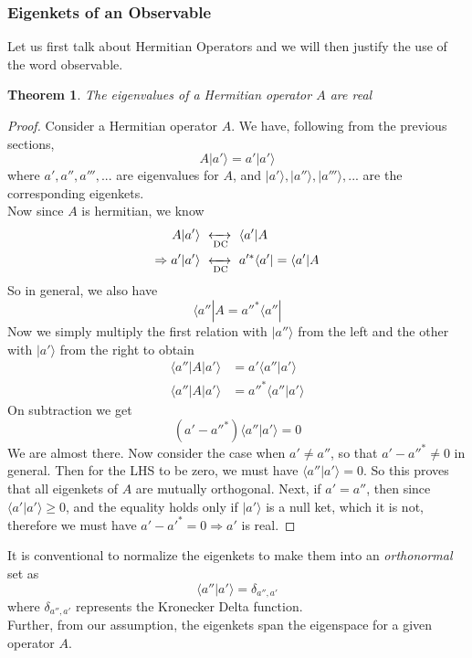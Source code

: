 \documentclass[12pt]{article}
\def\dc{\,\,\xleftrightarrow[\text{DC}]{}\,\,}
\def\bra#1{\langle#1|}
\def\ket#1{|#1 \rangle}
\def\inpr#1#2{\langle #1|#2 \rangle}
\def\braket#1#2#3{\langle#1|#2|#3\rangle}
\newtheorem*{theorem*}{Theorem}
\begin{document}
			\subsubsection{Eigenkets of an Observable}
				Let us first talk about Hermitian Operators and we will then justify the use of the word observable.\\
				\begin{theorem*}
					The eigenvalues of a Hermitian operator $A$ are real
				\end{theorem*}
				\begin{proof}
					Consider a Hermitian operator $A$. We have, following from the previous sections,
					\begin{equation}
						A\ket {a'} = a'\ket{a'}
					\end{equation}
					where $a', a'', a''', ...$ are eigenvalues for $A$, and $\ket{a'}, \ket {a''}, \ket {a'''},...$ are the corresponding eigenkets.\\
					Now since $A$ is hermitian, we know
					\begin{align*}
						A\ket{a'} &\dc \bra{a'}A \\
						\Rightarrow a'\ket{a'} &\dc a'^*\bra{a'} = \bra{a'}A
					\end{align*}
					So in general, we also have
					\begin{equation}
						\bra {a''} A = a''^* \bra{a''}
					\end{equation}
					Now we simply multiply the first relation with $\ket{a''}$ from the left and the other with $\ket{a'}$ from the right to obtain
					\begin{align}
						\braket {a''}A{a'} &= a'\inpr{a''}{a'} \\
						\braket {a''} A {a'} &= a''^* \inpr{a''}{a'}
					\end{align}
					On subtraction we get 
					\begin{equation}
						(a' - a''^*)\inpr{a''}{a'} = 0
					\end{equation}
					We are almost there. Now consider the case when $a' \ne a''$, so that $a'-a''^* \ne 0$ in general. Then for the LHS to be zero, we must have $\inpr {a''}{a'}=0$. So this proves that all eigenkets of $A$ are mutually orthogonal. Next, if $a' = a''$, then since $\inpr {a'}{a'} \ge 0$, and the equality holds only if $\ket {a'}$ is a null ket, which it is not, therefore we must have $a'-a'^* = 0 \Rightarrow a'$ is real.
				\end{proof}
				It is conventional to normalize the eigenkets to make them into an \emph{orthonormal} set as 
				\begin{equation}
					\inpr {a''} {a'} = \delta_{a'',a'}
				\end{equation}
				where $\delta_{a'',a'}$ represents the Kronecker Delta function.\\
				Further, from our assumption, the eigenkets span the eigenspace for a given operator $A$.\\
\end{document}
